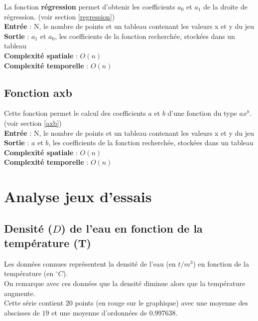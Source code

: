 \documentclass[12pt,french,titlepage]{article}
\begin{document}
	La fonction \textbf{régression} permet d'obtenir les coefficients $a_0$ et $a_1$ de  la droite de régression. (voir section \ref{regression})\\
	
	\textbf{Entrée} : N, le nombre de points et un tableau contenant les valeurs x et y du jeu\\
	\textbf{Sortie} : $a_1$ et $a_0$, les coefficients de la fonction recherchée, stockées dans un tableau\\
	\textbf{Complexité spatiale} : $O(n)$\\
	\textbf{Complexité temporelle} : $O(n) $\\
	
	\subsection{Fonction axb}
	
	\medskip
	Cette fonction permet le calcul des coefficients $a$ et $b$ d'une fonction du type $ax^b$. (voir section \ref{axb})\\
	
	\textbf{Entrée} : N, le nombre de points et un tableau contenant les valeurs x et y du jeu\\
	\textbf{Sortie} : $a$ et $b$, les coefficients de la fonction recherchée, stockées dans un tableau\\
	\textbf{Complexité spatiale} : $O(n)$\\
	\textbf{Complexité temporelle} : $O(n) $\\
	
	\section{Analyse jeux d'essais}
	
	\subsection{Densité ($D$) de l'eau en fonction de la température (T)}
		Les données connues représentent la densité de l'eau (en $t/m^3$) en fonction de la température (en $^\circ C$).\\
		On remarque avec ces données que la densité diminue alors que la température augmente.\\
		Cette série contient $20$ points (en rouge sur le graphique) avec une moyenne des abscisses de $19$ et une moyenne d'ordonnées de $0.997638
		$.\\
		
\end{document}
